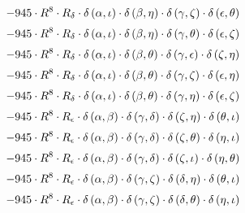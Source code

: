 \begin{subequations}
\begin{gather}
 \\[0.2em] \notag 		 - 945 \cdot R^{8} \cdot R_{\delta{}} \cdot \delta{}\left(\alpha{}, \iota{}\right) \cdot \delta{}\left(\beta{}, \eta{}\right) \cdot \delta{}\left(\gamma{}, \zeta{}\right) \cdot \delta{}\left(\epsilon{}, \theta{}\right) 
 \\[0.2em] \notag 		 - 945 \cdot R^{8} \cdot R_{\delta{}} \cdot \delta{}\left(\alpha{}, \iota{}\right) \cdot \delta{}\left(\beta{}, \eta{}\right) \cdot \delta{}\left(\gamma{}, \theta{}\right) \cdot \delta{}\left(\epsilon{}, \zeta{}\right) 
 \\[0.2em] \notag 		 - 945 \cdot R^{8} \cdot R_{\delta{}} \cdot \delta{}\left(\alpha{}, \iota{}\right) \cdot \delta{}\left(\beta{}, \theta{}\right) \cdot \delta{}\left(\gamma{}, \epsilon{}\right) \cdot \delta{}\left(\zeta{}, \eta{}\right) 
 \\[0.2em] \notag 		 - 945 \cdot R^{8} \cdot R_{\delta{}} \cdot \delta{}\left(\alpha{}, \iota{}\right) \cdot \delta{}\left(\beta{}, \theta{}\right) \cdot \delta{}\left(\gamma{}, \zeta{}\right) \cdot \delta{}\left(\epsilon{}, \eta{}\right) 
 \\[0.2em] \notag 		 - 945 \cdot R^{8} \cdot R_{\delta{}} \cdot \delta{}\left(\alpha{}, \iota{}\right) \cdot \delta{}\left(\beta{}, \theta{}\right) \cdot \delta{}\left(\gamma{}, \eta{}\right) \cdot \delta{}\left(\epsilon{}, \zeta{}\right) 
 \\[0.2em] \notag 		 - 945 \cdot R^{8} \cdot R_{\epsilon{}} \cdot \delta{}\left(\alpha{}, \beta{}\right) \cdot \delta{}\left(\gamma{}, \delta{}\right) \cdot \delta{}\left(\zeta{}, \eta{}\right) \cdot \delta{}\left(\theta{}, \iota{}\right) 
 \\[0.2em] \notag 		 - 945 \cdot R^{8} \cdot R_{\epsilon{}} \cdot \delta{}\left(\alpha{}, \beta{}\right) \cdot \delta{}\left(\gamma{}, \delta{}\right) \cdot \delta{}\left(\zeta{}, \theta{}\right) \cdot \delta{}\left(\eta{}, \iota{}\right) 
 \\[0.2em] \notag 		 - 945 \cdot R^{8} \cdot R_{\epsilon{}} \cdot \delta{}\left(\alpha{}, \beta{}\right) \cdot \delta{}\left(\gamma{}, \delta{}\right) \cdot \delta{}\left(\zeta{}, \iota{}\right) \cdot \delta{}\left(\eta{}, \theta{}\right) 
 \\[0.2em] \notag 		 - 945 \cdot R^{8} \cdot R_{\epsilon{}} \cdot \delta{}\left(\alpha{}, \beta{}\right) \cdot \delta{}\left(\gamma{}, \zeta{}\right) \cdot \delta{}\left(\delta{}, \eta{}\right) \cdot \delta{}\left(\theta{}, \iota{}\right) 
 \\[0.2em] \notag 		 - 945 \cdot R^{8} \cdot R_{\epsilon{}} \cdot \delta{}\left(\alpha{}, \beta{}\right) \cdot \delta{}\left(\gamma{}, \zeta{}\right) \cdot \delta{}\left(\delta{}, \theta{}\right) \cdot \delta{}\left(\eta{}, \iota{}\right) 

\end{gather}
\end{subequations}
